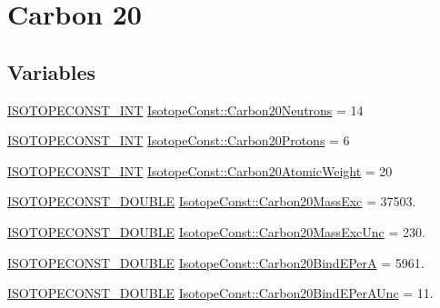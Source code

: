 \hypertarget{group___isotope_const-_carbon-_c20}{}\section{Carbon 20}
\label{group___isotope_const-_carbon-_c20}
\subsection*{Variables}
\begin{DoxyCompactItemize}
\item 
\mbox{\hyperlink{group___isotope_const-_macros_ga5f18360b3e99483a35c32d789e62621c}{I\+S\+O\+T\+O\+P\+E\+C\+O\+N\+S\+T\+\_\+\+I\+NT}} \mbox{\hyperlink{group___isotope_const-_carbon-_c20_ga69c25bf306c7016838fe740de2a0df38}{Isotope\+Const\+::\+Carbon20\+Neutrons}} = 14
\item 
\mbox{\hyperlink{group___isotope_const-_macros_ga5f18360b3e99483a35c32d789e62621c}{I\+S\+O\+T\+O\+P\+E\+C\+O\+N\+S\+T\+\_\+\+I\+NT}} \mbox{\hyperlink{group___isotope_const-_carbon-_c20_ga5d8c93e810f494ff4dc2d5b1c1ad090b}{Isotope\+Const\+::\+Carbon20\+Protons}} = 6
\item 
\mbox{\hyperlink{group___isotope_const-_macros_ga5f18360b3e99483a35c32d789e62621c}{I\+S\+O\+T\+O\+P\+E\+C\+O\+N\+S\+T\+\_\+\+I\+NT}} \mbox{\hyperlink{group___isotope_const-_carbon-_c20_ga1c06335ffc59ce8f125ef880caa6a0e5}{Isotope\+Const\+::\+Carbon20\+Atomic\+Weight}} = 20
\item 
\mbox{\hyperlink{group___isotope_const-_macros_ga8f45a7272ce02c0b4c65c44636ed719a}{I\+S\+O\+T\+O\+P\+E\+C\+O\+N\+S\+T\+\_\+\+D\+O\+U\+B\+LE}} \mbox{\hyperlink{group___isotope_const-_carbon-_c20_ga8394b77c4368deb0c1f97a360525793d}{Isotope\+Const\+::\+Carbon20\+Mass\+Exc}} = 37503.
\item 
\mbox{\hyperlink{group___isotope_const-_macros_ga8f45a7272ce02c0b4c65c44636ed719a}{I\+S\+O\+T\+O\+P\+E\+C\+O\+N\+S\+T\+\_\+\+D\+O\+U\+B\+LE}} \mbox{\hyperlink{group___isotope_const-_carbon-_c20_gacb50c11663ba9f8fe069973b6019097d}{Isotope\+Const\+::\+Carbon20\+Mass\+Exc\+Unc}} = 230.
\item 
\mbox{\hyperlink{group___isotope_const-_macros_ga8f45a7272ce02c0b4c65c44636ed719a}{I\+S\+O\+T\+O\+P\+E\+C\+O\+N\+S\+T\+\_\+\+D\+O\+U\+B\+LE}} \mbox{\hyperlink{group___isotope_const-_carbon-_c20_ga5415ecbde9dd81f3e3a5df8da26e9b32}{Isotope\+Const\+::\+Carbon20\+Bind\+E\+PerA}} = 5961.
\item 
\mbox{\hyperlink{group___isotope_const-_macros_ga8f45a7272ce02c0b4c65c44636ed719a}{I\+S\+O\+T\+O\+P\+E\+C\+O\+N\+S\+T\+\_\+\+D\+O\+U\+B\+LE}} \mbox{\hyperlink{group___isotope_const-_carbon-_c20_ga56c9f8f828d6007b15705d9e3a2c6470}{Isotope\+Const\+::\+Carbon20\+Bind\+E\+Per\+A\+Unc}} = 11.

\end{DoxyCompactItemize}
